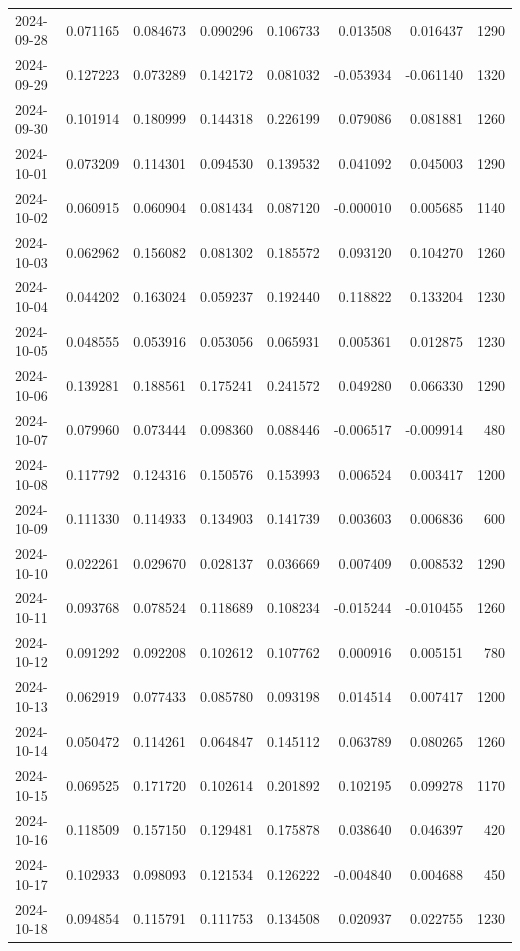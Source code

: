 \begin{tabular}{lrrrrrrr}
2024-09-28 & 0.071165 & 0.084673 & 0.090296 & 0.106733 & 0.013508 & 0.016437 & 1290 \\
2024-09-29 & 0.127223 & 0.073289 & 0.142172 & 0.081032 & -0.053934 & -0.061140 & 1320 \\
2024-09-30 & 0.101914 & 0.180999 & 0.144318 & 0.226199 & 0.079086 & 0.081881 & 1260 \\
2024-10-01 & 0.073209 & 0.114301 & 0.094530 & 0.139532 & 0.041092 & 0.045003 & 1290 \\
2024-10-02 & 0.060915 & 0.060904 & 0.081434 & 0.087120 & -0.000010 & 0.005685 & 1140 \\
2024-10-03 & 0.062962 & 0.156082 & 0.081302 & 0.185572 & 0.093120 & 0.104270 & 1260 \\
2024-10-04 & 0.044202 & 0.163024 & 0.059237 & 0.192440 & 0.118822 & 0.133204 & 1230 \\
2024-10-05 & 0.048555 & 0.053916 & 0.053056 & 0.065931 & 0.005361 & 0.012875 & 1230 \\
2024-10-06 & 0.139281 & 0.188561 & 0.175241 & 0.241572 & 0.049280 & 0.066330 & 1290 \\
2024-10-07 & 0.079960 & 0.073444 & 0.098360 & 0.088446 & -0.006517 & -0.009914 & 480 \\
2024-10-08 & 0.117792 & 0.124316 & 0.150576 & 0.153993 & 0.006524 & 0.003417 & 1200 \\
2024-10-09 & 0.111330 & 0.114933 & 0.134903 & 0.141739 & 0.003603 & 0.006836 & 600 \\
2024-10-10 & 0.022261 & 0.029670 & 0.028137 & 0.036669 & 0.007409 & 0.008532 & 1290 \\
2024-10-11 & 0.093768 & 0.078524 & 0.118689 & 0.108234 & -0.015244 & -0.010455 & 1260 \\
2024-10-12 & 0.091292 & 0.092208 & 0.102612 & 0.107762 & 0.000916 & 0.005151 & 780 \\
2024-10-13 & 0.062919 & 0.077433 & 0.085780 & 0.093198 & 0.014514 & 0.007417 & 1200 \\
2024-10-14 & 0.050472 & 0.114261 & 0.064847 & 0.145112 & 0.063789 & 0.080265 & 1260 \\
2024-10-15 & 0.069525 & 0.171720 & 0.102614 & 0.201892 & 0.102195 & 0.099278 & 1170 \\
2024-10-16 & 0.118509 & 0.157150 & 0.129481 & 0.175878 & 0.038640 & 0.046397 & 420 \\
2024-10-17 & 0.102933 & 0.098093 & 0.121534 & 0.126222 & -0.004840 & 0.004688 & 450 \\
2024-10-18 & 0.094854 & 0.115791 & 0.111753 & 0.134508 & 0.020937 & 0.022755 & 1230 \\

\end{tabular}
